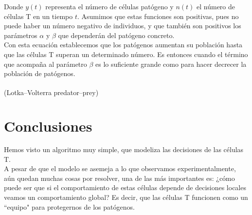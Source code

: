 \documentclass{article}
\begin{document}
	Donde $y(t)$ representa el número de células patógeno y $n(t)$ el número de células T en un tiempo $t$. Asumimos que estas funciones son positivas, pues no puede haber un número negativo de individuos, y que también son positivos los parámetros $\alpha$ y $\beta$ que dependerán del patógeno concreto.
	\\
	Con esta ecuación establecemos que los patógenos aumentan su población hasta que las células T superan un determinado número. Es entonces cuando el término que acompaña al parámetro $\beta$ es lo suficiente grande como para hacer decrecer la población de patógenos.
	\\
	\\
	(Lotka–Volterra predator–prey)
	
	\section{Conclusiones}
	Hemos visto un algoritmo muy simple, que modeliza las decisiones de las células T.
	\\
	A pesar de que el modelo se asemeja a lo que observamos experimentalmente, aún quedan muchas cosas por resolver, una de las más importantes es: ¿cómo puede ser que si el comportamiento de estas células depende de decisiones locales veamos un comportamiento global? Es decir, que las células T funcionen como un ``equipo" para protegernos de los patógenos. 
	
	
\end{document}
